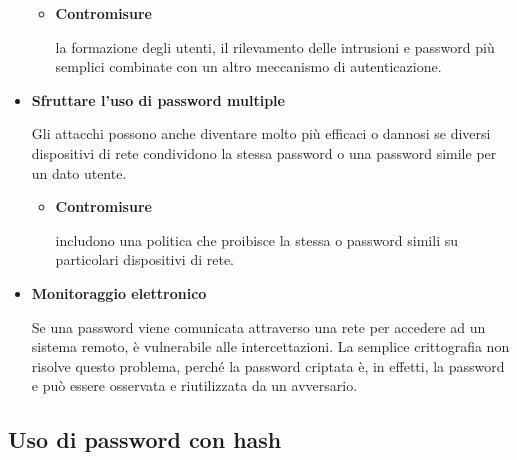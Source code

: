 \begin{itemize}
\begin{itemize}
    \item \textbf{Contromisure}
    
     la formazione degli utenti, il rilevamento delle intrusioni e password più semplici combinate con un altro meccanismo di autenticazione.
     
\end{itemize}

\item\textbf{Sfruttare l'uso di password multiple}

Gli attacchi possono anche diventare molto più efficaci o dannosi se diversi dispositivi di rete condividono la stessa password o una password simile per un dato utente. 

\begin{itemize}
    \item \textbf{Contromisure} 
    
    includono una politica che proibisce la stessa o password simili su particolari dispositivi di rete.
    
\end{itemize}
\newpage
\item \textbf{Monitoraggio elettronico}

Se una password viene comunicata attraverso una rete per accedere ad un sistema remoto, è vulnerabile alle intercettazioni. La semplice crittografia non risolve questo problema, perché la password criptata è, in effetti, la password e può essere osservata e riutilizzata da un avversario.

\end{itemize}
\subsection{Uso di password con hash}

